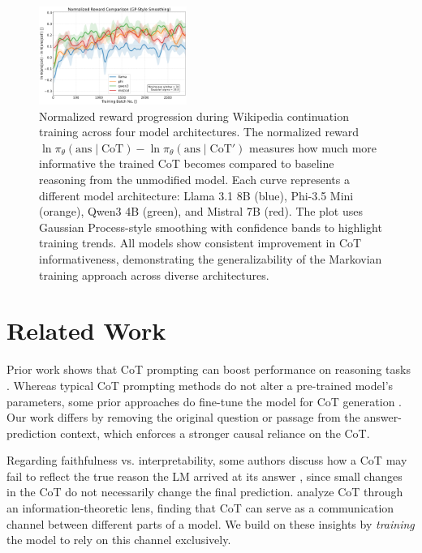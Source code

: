 \documentclass{article} %
\begin{document}
\begin{figure}[t]
  \centering
    \includegraphics[width=0.43\textwidth]{Figures/combined_normalized_reward_gp_smoothed.png}
    \caption{Normalized reward progression during Wikipedia continuation training across four model architectures. The normalized reward $\ln \pi_\theta(\text{ans} \mid \text{CoT}) - \ln \pi_\theta(\text{ans} \mid \text{CoT}')$ measures how much more informative the trained CoT becomes compared to baseline reasoning from the unmodified model. Each curve represents a different model architecture: Llama 3.1 8B (blue), Phi-3.5 Mini (orange), Qwen3 4B (green), and Mistral 7B (red). The plot uses Gaussian Process-style smoothing with confidence bands to highlight training trends. All models show consistent improvement in CoT informativeness, demonstrating the generalizability of the Markovian training approach across diverse architectures.}
    \label{fig:loss}
\end{figure}

\section{Related Work}
\label{sec:related_work}

Prior work shows that CoT prompting can boost performance on reasoning tasks \citep{wei2022chain, nye2022show}.
Whereas typical CoT prompting methods do not alter a pre-trained model's parameters, some prior approaches do fine-tune the model for CoT generation \citep{eric_star2022, zelikman2024quietstar, deepseekai2025}. Our work differs by removing the original question or passage from the answer-prediction context, which enforces a stronger causal reliance on the CoT.

Regarding faithfulness vs. interpretability, some authors discuss how a CoT may fail to reflect the true reason the LM arrived at its answer \citep{lanham2023measuring, turpin2023language}, since small changes in the CoT do not necessarily change the final prediction. \citet{zhou2023understanding} analyze CoT through an information-theoretic lens, finding that CoT can serve as a communication channel between different parts of a model. We build on these insights by \emph{training} the model to rely on this channel exclusively.
\end{document}
